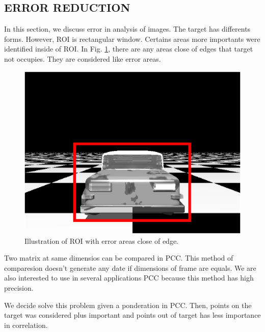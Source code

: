 \subsection{ERROR REDUCTION}

In this section, we discuss error in analysis of images. The target has differents forms. However, 
ROI is rectangular window. Certains areas more importants were identified inside of ROI.
In Fig. \ref{fig:erroridentified}, there are any areas close of edges that target not occupies. They are
considered like error areas.

\begin{figure}[H]
\includegraphics[width=\columnwidth]{images/imageError.eps}
\caption{Illustration of ROI with error areas close of edge.}
\label{fig:erroridentified}
\end{figure}

Two matrix at same dimensios can be compared in PCC. This method of comparesion doesn't generate
any date if dimensions of frame are equals. 
We are also interested to use in several applications PCC because this method has high precision.

We decide solve this problem given a ponderation in PCC. Then, points on the target was considered plus important
and points out of target has less importance in correlation.

